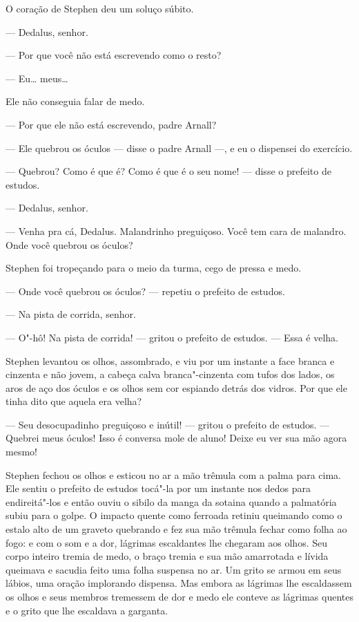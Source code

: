O coração de Stephen deu um soluço súbito.

 --- Dedalus, senhor.

 --- Por que você não está escrevendo como o resto?

 --- Eu\ldots{} meus\ldots{}

Ele não conseguia falar de medo.

 --- Por que ele não está escrevendo, padre Arnall?

 --- Ele quebrou os óculos --- disse o padre Arnall ---, e eu o dispensei do
exercício.

 --- Quebrou? Como é que é? Como é que é o seu nome! --- disse o prefeito de
estudos.

 --- Dedalus, senhor.

 --- Venha pra cá, Dedalus. Malandrinho preguiçoso. Você tem cara de
malandro. Onde você quebrou os óculos?

Stephen foi tropeçando para o meio da turma, cego de pressa e medo.

 --- Onde você quebrou os óculos? --- repetiu o prefeito de estudos.

 --- Na pista de corrida, senhor.

 --- O"-hô! Na pista de corrida! --- gritou o prefeito de estudos. --- Essa é velha.

Stephen levantou os olhos, assombrado, e viu por um instante a face
branca e cinzenta e não jovem, a cabeça calva branca"-cinzenta com tufos
dos lados, os aros de aço dos óculos e os olhos sem cor espiando detrás
dos vidros. Por que ele tinha dito que aquela era velha?

 --- Seu desocupadinho preguiçoso e inútil! --- gritou o prefeito de estudos.
 --- Quebrei meus óculos! Isso é conversa mole de aluno! Deixe eu ver sua mão
agora mesmo!

Stephen fechou os olhos e esticou no ar a mão trêmula com a palma para
cima. Ele sentiu o prefeito de estudos tocá"-la por um instante nos
dedos para endireitá"-los e então ouviu o sibilo da manga da sotaina
quando a palmatória subiu para o golpe. O impacto quente como ferroada
retiniu queimando como o estalo alto de um graveto quebrando e fez sua
mão trêmula fechar como folha ao fogo: e com o som e a dor, lágrimas
escaldantes lhe chegaram aos olhos. Seu corpo inteiro tremia de medo, o
braço tremia e sua mão amarrotada e lívida queimava e sacudia feito uma
folha suspensa no ar. Um grito se armou em seus lábios, uma oração
implorando dispensa. Mas embora as lágrimas lhe escaldassem os olhos e
seus membros tremessem de dor e medo ele conteve as lágrimas quentes e
o grito que lhe escaldava a garganta.


